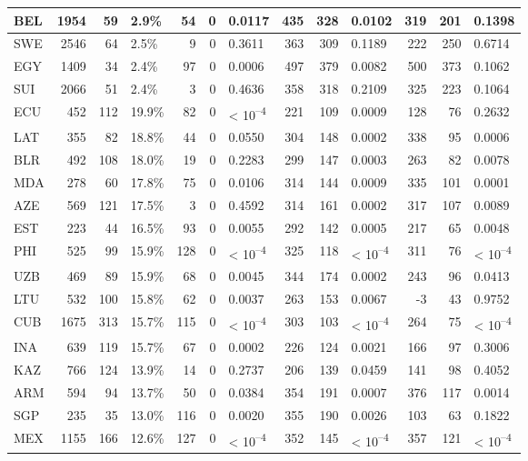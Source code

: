 \begin{tabular}{l|r|r|l|r|r|l|r|r|l|r|r|l}
\hline
BEL & 1954 & 59 & 2.9\% & 54 & 0 & 0.0117 & 435 & 328 & 0.0102 & 319 & 201 & 0.1398\\
\hline
SWE & 2546 & 64 & 2.5\% & 9 & 0 & 0.3611 & 363 & 309 & 0.1189 & 222 & 250 & 0.6714\\
\hline
EGY & 1409 & 34 & 2.4\% & 97 & 0 & 0.0006 & 497 & 379 & 0.0082 & 500 & 373 & 0.1062\\
\hline
SUI & 2066 & 51 & 2.4\% & 3 & 0 & 0.4636 & 358 & 318 & 0.2109 & 325 & 223 & 0.1064\\
\hline
ECU & 452 & 112 & 19.9\% & 82 & 0 & < 10\textsuperscript{--4} & 221 & 109 & 0.0009 & 128 & 76 & 0.2632\\
\hline
LAT & 355 & 82 & 18.8\% & 44 & 0 & 0.0550 & 304 & 148 & 0.0002 & 338 & 95 & 0.0006\\
\hline
BLR & 492 & 108 & 18.0\% & 19 & 0 & 0.2283 & 299 & 147 & 0.0003 & 263 & 82 & 0.0078\\
\hline
MDA & 278 & 60 & 17.8\% & 75 & 0 & 0.0106 & 314 & 144 & 0.0009 & 335 & 101 & 0.0001\\
\hline
AZE & 569 & 121 & 17.5\% & 3 & 0 & 0.4592 & 314 & 161 & 0.0002 & 317 & 107 & 0.0089\\
\hline
EST & 223 & 44 & 16.5\% & 93 & 0 & 0.0055 & 292 & 142 & 0.0005 & 217 & 65 & 0.0048\\
\hline
PHI & 525 & 99 & 15.9\% & 128 & 0 & < 10\textsuperscript{--4} & 325 & 118 & < 10\textsuperscript{--4} & 311 & 76 & < 10\textsuperscript{--4}\\
\hline
UZB & 469 & 89 & 15.9\% & 68 & 0 & 0.0045 & 344 & 174 & 0.0002 & 243 & 96 & 0.0413\\
\hline
LTU & 532 & 100 & 15.8\% & 62 & 0 & 0.0037 & 263 & 153 & 0.0067 & -3 & 43 & 0.9752\\
\hline
CUB & 1675 & 313 & 15.7\% & 115 & 0 & < 10\textsuperscript{--4} & 303 & 103 & < 10\textsuperscript{--4} & 264 & 75 & < 10\textsuperscript{--4}\\
\hline
INA & 639 & 119 & 15.7\% & 67 & 0 & 0.0002 & 226 & 124 & 0.0021 & 166 & 97 & 0.3006\\
\hline
KAZ & 766 & 124 & 13.9\% & 14 & 0 & 0.2737 & 206 & 139 & 0.0459 & 141 & 98 & 0.4052\\
\hline
ARM & 594 & 94 & 13.7\% & 50 & 0 & 0.0384 & 354 & 191 & 0.0007 & 376 & 117 & 0.0014\\
\hline
SGP & 235 & 35 & 13.0\% & 116 & 0 & 0.0020 & 355 & 190 & 0.0026 & 103 & 63 & 0.1822\\
\hline
MEX & 1155 & 166 & 12.6\% & 127 & 0 & < 10\textsuperscript{--4} & 352 & 145 & < 10\textsuperscript{--4} & 357 & 121 & < 10\textsuperscript{--4}\\

\end{tabular}
